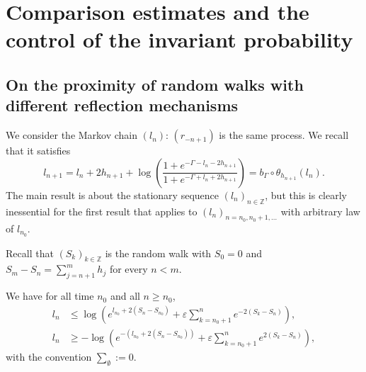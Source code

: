 \documentclass[AHL,Unicode,longabstracts,published]{cedram}
\newcommand{\bbZ}{\mathbb{Z}}
\newcommand{\gep}{\varepsilon}
\newcommand{\gG}{\Gamma}
\begin{document}
\section{Comparison estimates and the control of the invariant probability }\label{sec:comp-nu}


\subsection{On the proximity of random walks with different reflection mechanisms}\label{sec:comp}
We consider the Markov chain $(l_n)$: $(r_{-n+1})$ is the same process. We recall that it satisfies
\begin{equation}
l_{n+1}= l_n+2h_{n+1}+ \log \left(\frac{1+ e^{-\gG -l_n-2h_{n+1}}}{1+ e^{-\gG +l_n+2h_{n+1}}} \right)= b_\gG\circ \theta_{h_{n+1}}(l_n).
\end{equation}
The main result is about the stationary sequence $(l_n)_{n \in \bbZ}$, but this is clearly inessential for the first result that applies to $(l_n)_{n=n_0, n_0+1, \dots}$ with arbitrary law of $l_{n_0}$.

Recall that $(S_k)_{k\in \bbZ}$ is the random walk with $S_0=0$ and $S_{m}-S_n= \sum_{j=n+1}^m h_j$ for every $n< m$.

\begin{lemm}\label{th:forNrandom}
We have for all time $n_0$ and all $n\ge n_0$,
\begin{align}
l_n &\le \log\left(e^{l_{n_0}+ 2 \left(S_n-S_{n_0}\right)} + \gep \sum_{k={n_0}+1}^{n} e^{-2(S_k-S_{n})} \right), \label{eq:ln<}
\\
l_n &\ge -\log \left(e^{-\left(l_{n_0}+ 2 (S_n-S_{n_0})\right)}+ \gep \sum_{k={n_0}+1}^{n} e^{2(S_k-S_{n})} \right), \label{eq:ln>}
\end{align}
with the convention $\sum_\emptyset:=0$.
\end{lemm}
\end{document}
